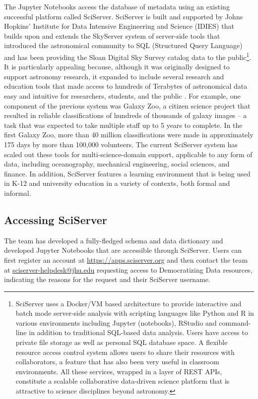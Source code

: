 \documentclass[titlepage, 11pt]{article}
\begin{document}
{The Jupyter Notebooks access the database of metadata using an existing successful platform called SciServer. SciServer is built and supported by Johns Hopkins’ Institute for Data Intensive Engineering and Science (IDIES) that builds upon and extends the SkyServer system of server-side tools that introduced the astronomical community to SQL (Structured Query Language) and has been providing the Sloan Digital Sky Survey catalog data to the public\footnote{SciServer uses a Docker/VM based architecture to provide interactive and batch mode server-side analysis with scripting languages like Python and R in various environments including Jupyter (notebooks), RStudio and command-line in addition to traditional SQL-based data analysis. Users have access to private file storage as well as personal SQL database space. A flexible resource access control system allows users to share their resources with collaborators, a feature that has also been very useful in classroom environments. All these services, wrapped in a layer of REST APIs, constitute a scalable collaborative data-driven science platform that is attractive to science disciplines beyond astronomy.}.  It is particularly appealing because, although it was originally designed to support astronomy research, it expanded to include several research and education tools that made access to hundreds of Terabytes of astronomical data easy and intuitive for researchers, students, and the public\cite{source8,source9} . For example, one component of the previous system was Galaxy Zoo, a citizen science project that resulted in reliable classifications of hundreds of thousands of galaxy images – a task that was expected to take multiple staff up to 5 years to complete. In the first Galaxy Zoo, more than 40 million classifications were made in approximately 175 days by more than 100,000 volunteers.\cite{source10}  The current SciServer system has scaled out these tools for multi-science-domain support, applicable to any form of data, including oceanography, mechanical engineering, social sciences, and finance. In addition, SciServer features a learning environment that is being used in K-12 and university education in a variety of contexts, both formal and informal.

\subsection{Accessing SciServer}
The team has developed a fully-fledged schema and data dictionary and developed Jupyter Notebooks that are accessible through SciServer. Users can first register an account at \url{https://apps.sciserver.org} and then contact the team at \href{mailto:sciserver-helpdesk@jhu.edu}{sciserver-helpdesk@jhu.edu} requesting access to Democratizing Data resources, indicating the reasons for the request and their SciServer username.

}
\end{document}
